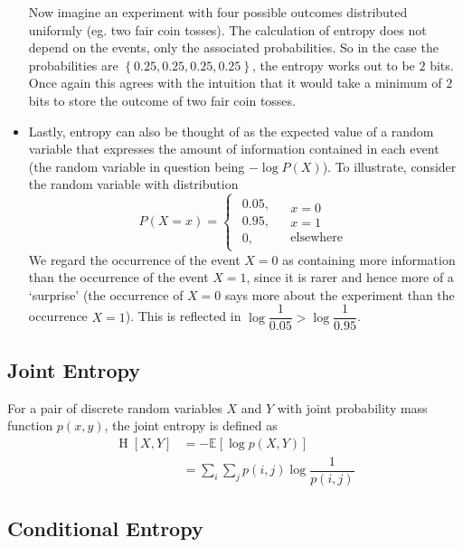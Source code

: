 \documentclass[11pt]{report} %
\begin{document}
\begin{itemize}
Now imagine an experiment with four possible outcomes distributed uniformly (eg. two fair coin tosses). The calculation of entropy does not depend on the events, only the associated probabilities. So in the case the probabilities are $\left\{0.25, 0.25, 0.25, 0.25\right\}$, the entropy works out to be $2$ bits. Once again this agrees with the intuition that it would take a minimum of $2$ bits to store the outcome of two fair coin tosses.
\item Lastly, entropy can also be thought of as the expected value of a random variable that expresses the amount of information contained in each event (the random variable in question being $-\log P\left(X\right)$). To illustrate, consider the random variable with distribution
\begin{equation}
P\left(X = x\right) = \begin{cases}
\begin{array}{c}
0.05,\\
0.95,\\
0,
\end{array} & \begin{array}{c}
x=0\\
x=1\\
\text{elsewhere}
\end{array}\end{cases}
\end{equation}
We regard the occurrence of the event $X = 0$ as containing more information than the occurrence of the event $X = 1$, since it is rarer and hence more of a `surprise' (the occurrence of $X = 0$ says more about the experiment than the occurrence $X = 1$). This is reflected in $\log\dfrac{1}{0.05} > \log\dfrac{1}{0.95}$.
\end{itemize}

\subsection{Joint Entropy}

For a pair of discrete random variables $X$ and $Y$ with joint probability mass function $p\left(x, y\right)$, the joint entropy is defined as
\begin{align}
\operatorname{H}\left[X, Y\right] &= -\mathbb{E}\left[\log p\left(X, Y\right)\right] \\
&= \sum_{i}\sum_{j}p\left(i, j\right)\log\dfrac{1}{p\left(i, j\right)}
\end{align}

\subsection{Conditional Entropy}
\end{document}
